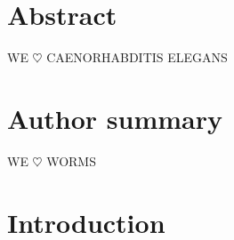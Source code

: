 \documentclass[10pt,letterpaper]{article}
\begin{document}
\section*{Abstract}
WE $\heartsuit$ CAENORHABDITIS ELEGANS


\section*{Author summary}
WE $\heartsuit$ WORMS

\linenumbers

\section*{Introduction}
\end{document}
